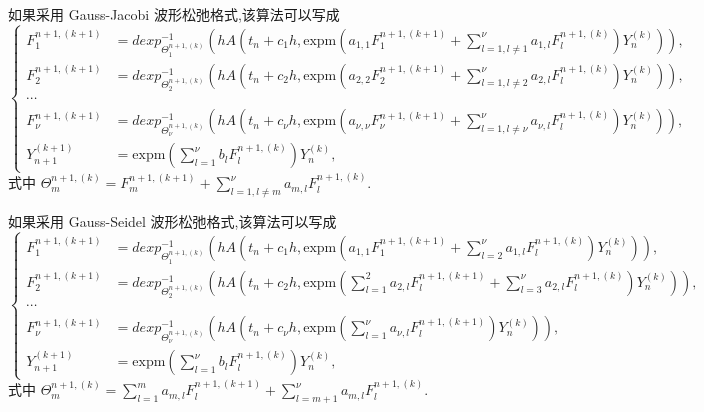 如果采用 Gauss-Jacobi 波形松弛格式,该算法可以写成
\begin{equation*}
	\left\lbrace\begin{aligned}
		F_1^{n+1,(k+1)}&=dexp_{\Theta_1^{n+1,(k)}}^{-1}(hA(t_n+c_1h,\mbox{expm}(a_{1,1}F_1^{n+1,(k+1)}+\sum_{l=1,l\neq 1}^{\nu}a_{1,l}F_l^{n+1,(k)})Y_n^{(k)})),\\
		F_2^{n+1,(k+1)}&=dexp_{\Theta_2^{n+1,(k)}}^{-1}(hA(t_n+c_2h,\mbox{expm}(a_{2,2}F_2^{n+1,(k+1)}+\sum_{l=1,l\neq 2}^{\nu}a_{2,l}F_l^{n+1,(k)})Y_n^{(k)})),\\
		\cdots \\
		F_{\nu}^{n+1,(k+1)}&=dexp_{\Theta_{\nu}^{n+1,(k)}}^{-1}(hA(t_n+c_{\nu}h,\mbox{expm}(a_{\nu,\nu}F_{\nu}^{n+1,(k+1)}+\sum_{l=1,l\neq \nu}^{\nu}a_{\nu,l}F_l^{n+1,(k)})Y_n^{(k)})),\\
		Y_{n+1}^{(k+1)}&=\mbox{expm}(\sum_{l=1}^{\nu}b_lF_l^{n+1,(k)})Y_n^{(k)},
	\end{aligned}\right.
\end{equation*}
式中 $\Theta_m^{n+1,(k)} = F_{m}^{n+1,(k+1)}+\sum_{l=1,l\neq m}^{\nu}a_{m,l}F_l^{n+1,(k)}$.

如果采用 Gauss-Seidel 波形松弛格式,该算法可以写成
\begin{equation*}
	\left\lbrace\begin{aligned}
		F_1^{n+1,(k+1)}&=dexp_{\Theta_1^{n+1,(k)}}^{-1}(hA(t_n+c_1h,\mbox{expm}(a_{1,1}F_1^{n+1,(k+1)}+\sum_{l=2}^{\nu}a_{1,l}F_l^{n+1,(k)})Y_n^{(k)})),\\
		F_2^{n+1,(k+1)}&=dexp_{\Theta_2^{n+1,(k)}}^{-1}(hA(t_n+c_2h,\mbox{expm}(\sum_{l=1}^{2}a_{2,l}F_l^{n+1,(k+1)}+\sum_{l=3}^{\nu}a_{2,l}F_l^{n+1,(k)})Y_n^{(k)})),\\
		\cdots \\
		F_{\nu}^{n+1,(k+1)}&=dexp_{\Theta_{\nu}^{n+1,(k)}}^{-1}(hA(t_n+c_{\nu}h,\mbox{expm}(\sum_{l=1}^{\nu}a_{\nu,l}F_{l}^{n+1,(k+1)})Y_n^{(k)})),\\
		Y_{n+1}^{(k+1)}&=\mbox{expm}(\sum_{l=1}^{\nu}b_lF_l^{n+1,(k)})Y_n^{(k)},
	\end{aligned}\right.
\end{equation*}
式中 $\Theta_m^{n+1,(k)} = \sum_{l=1}^{m}a_{m,l}F_{l}^{n+1,(k+1)}+\sum_{l=m+1}^{\nu}a_{m,l}F_l^{n+1,(k)}$.

